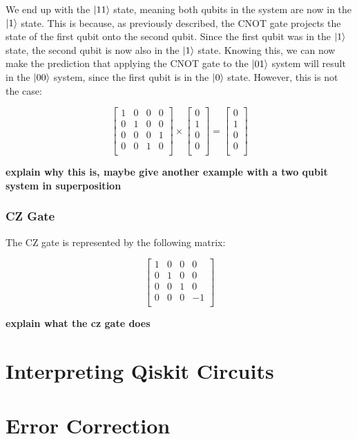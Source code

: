 \documentclass{article}
\begin{document}
We end up with the $\ket{11}$ state, meaning both qubits in the system are now in the $\ket{1}$ state. This is because, as previously described, the CNOT gate projects the state
of the first qubit onto the second qubit. Since the first qubit was in the $\ket{1}$ state, the second qubit is now also in the $\ket{1}$ state. Knowing this, we can now make 
the prediction that applying the CNOT gate to the $\ket{01}$ system will result in the $\ket{00}$ system, since the first qubit is in the $\ket{0}$ state. However, this is not
the case:

\[
	\begin{bmatrix}
		1 & 0 & 0 & 0 \\
		0 & 1 & 0 & 0 \\
		0 & 0 & 0 & 1 \\
		0 & 0 & 1 & 0 \\
	\end{bmatrix}
	\times
	\begin{bmatrix}
		0 \\
		1 \\
		0 \\
		0 \\
	\end{bmatrix}
	=
	\begin{bmatrix}
		0 \\
		1 \\
		0 \\
		0 \\
	\end{bmatrix}
\]

\textbf{explain why this is, maybe give another example with a two qubit system in superposition}

\subsubsection{CZ Gate}
\label{sec:czgate}

The CZ gate is represented by the following matrix:

\[
	\begin{bmatrix}
		1 & 0 & 0 & 0 \\
		0 & 1 & 0 & 0 \\
		0 & 0 & 1 & 0 \\
		0 & 0 & 0 & -1 \\
	\end{bmatrix}
\]

\textbf{explain what the cz gate does}

\section{Interpreting Qiskit Circuits}

\section{Error Correction}
\end{document}
